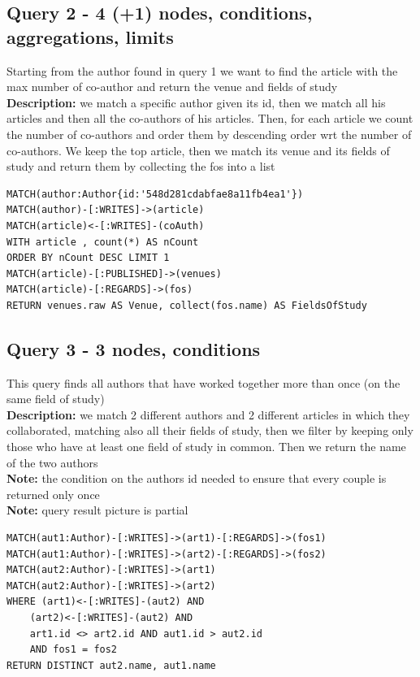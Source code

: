 \documentclass{Configuration_Files/PoliMi3i_thesis}
\begin{document}
\subsection{Query 2 - 4 (+1) nodes, conditions, aggregations, limits }
Starting from the author found in query 1 we want to find the article with the max number of co-author and return the venue and fields of study\\
\textbf{Description:} we match a specific author given its id, then we match all his articles and then all the co-authors of his articles.
Then, for each article we count the number of co-authors and order them by descending order wrt the number of co-authors.
We keep the top article, then we match its venue and its fields of study and return them by collecting the fos into a list
\begin{lstlisting}[language=cypher, label=lst:cypher-example]
MATCH(author:Author{id:'548d281cdabfae8a11fb4ea1'})
MATCH(author)-[:WRITES]->(article)
MATCH(article)<-[:WRITES]-(coAuth)
WITH article , count(*) AS nCount
ORDER BY nCount DESC LIMIT 1
MATCH(article)-[:PUBLISHED]->(venues)
MATCH(article)-[:REGARDS]->(fos)
RETURN venues.raw AS Venue, collect(fos.name) AS FieldsOfStudy
\end{lstlisting}

\subsection{Query 3 - 3 nodes, conditions}
This query finds all authors that have worked together more than once (on the same field of study)\\
\textbf{Description:} we match 2 different authors and 2 different articles in which they collaborated,
matching also all their fields of study, then we filter by keeping only those who have at least one field of study in common.
Then we return the name of the two authors\\
\textbf{Note:} the condition on the authors id needed to ensure that every couple is returned only once\\
\textbf{Note:} query result picture is partial
\begin{lstlisting}[language=cypher, label=lst:cypher-example]
MATCH(aut1:Author)-[:WRITES]->(art1)-[:REGARDS]->(fos1)
MATCH(aut1:Author)-[:WRITES]->(art2)-[:REGARDS]->(fos2)
MATCH(aut2:Author)-[:WRITES]->(art1)
MATCH(aut2:Author)-[:WRITES]->(art2)
WHERE (art1)<-[:WRITES]-(aut2) AND
    (art2)<-[:WRITES]-(aut2) AND
    art1.id <> art2.id AND aut1.id > aut2.id
    AND fos1 = fos2
RETURN DISTINCT aut2.name, aut1.name
\end{lstlisting}
\end{document}
